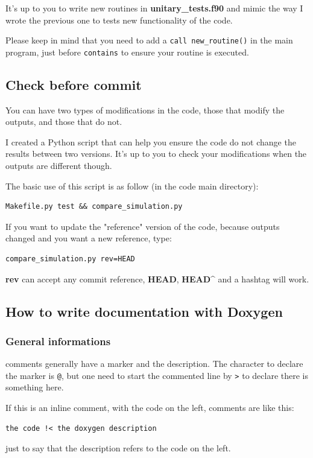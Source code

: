 \documentclass[english,a4paper,twoside]{article}
\begin{document}
\begin{remarque}
It's up to you to write new routines in \textbf{unitary\_tests.f90} and mimic the way I wrote the previous one to tests new functionality of the code.

Please keep in mind that you need to add a \verb|call new_routine()| in the main program, just before \verb|contains| to ensure your routine is executed.
\end{remarque}

\subsection{Check before commit}\label{sec:compare_simulation}
You can have two types of modifications in the code, those that modify the outputs, and those that do not.

I created a Python script  that can help you ensure the code do not change the results between two versions. It's up to you to check your modifications when the outputs are different though.

\bigskip

The basic use of this script is as follow (in the code main directory):
\begin{verbatim}
Makefile.py test && compare_simulation.py
\end{verbatim}

\bigskip

If you want to update the "reference" version of the code, because outputs changed and you want a new reference, type:
\begin{verbatim}
compare_simulation.py rev=HEAD
\end{verbatim}
\textbf{rev} can accept any commit reference, \textbf{HEAD}, \textbf{HEAD\^} and a hashtag will work.

\subsection{How to write documentation with Doxygen}
\subsubsection{General informations}
 comments generally have a marker and the description. The character to declare the marker is \verb|@|, but one need to start the commented line by \verb|>| to declare there is something here. 

If this is an inline comment, with the code on the left, comments are like this:
\begin{verbatim}
the code !< the doxygen description
\end{verbatim}
just to say that the description refers to the code on the left.
\end{document}
